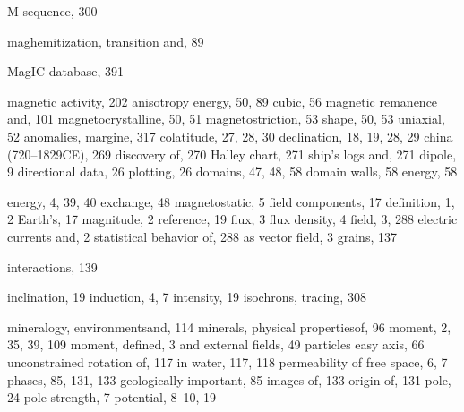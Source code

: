 \documentclass[,plain]{tauxe}
\begin{document}
\begin{theindex}
  \item M-sequence, 300
  \item maghemitization, transition and, 89
  \item MagIC database, 391
  \item magnetic
    \subitem activity, 202
	\subitem anisotropy energy, 50, 89
      \subsubitem cubic, 56
	  \subsubitem magnetic remanence and, 101
      \subsubitem magnetocrystalline, 50, 51
      \subsubitem magnetostriction, 53
      \subsubitem shape, 50, 53
      \subsubitem uniaxial, 52
	\subitem anomalies, margine, 317   
	\subitem colatitude, 27, 28, 30
	\subitem declination, 18, 19, 28, 29
		\subsubitem china (720--1829CE), 269
        \subsubitem discovery of, 270
		\subsubitem Halley chart, 271
		\subsubitem ship's logs and, 271
    \subitem dipole, 9
    \subitem directional data, 26
    \subsubitem plotting, 26
	\subitem domains, 47, 48, 58
	\subitem domain walls, 58
      \subsubitem energy, 58
    
\subitem energy, 4, 39, 40
      \subsubitem exchange, 48
      \subsubitem magnetostatic, 5
    \subitem field
      \subsubitem components, 17
      \subsubitem definition, 1, 2
      \subsubitem Earth's, 17
      \subsubitem magnitude, 2
	  \subsubitem reference, 19
    \subitem flux, 3
    \subitem flux density, 4
    \subitem field, 3, 288
		\subsubitem electric currents and, 2
		\subsubitem statistical behavior of, 288
		\subsubitem as vector field, 3
\subitem grains, 137

	\subitem interactions, 139
	
	\subitem inclination, 19
    \subitem induction, 4, 7
    \subitem intensity, 19
    \subitem isochrons, tracing, 308

	
    \subitem mineralogy, environments\break and, 114
	\subitem minerals, physical properties\break of, 96
	\subitem moment, 2, 35, 39, 109
	\subitem moment, defined, 3
		\subsubitem and external fields, 49
	\subitem particles 
		\subsubitem easy axis, 66
		\subsubitem unconstrained rotation of, 117
		\subsubitem in water, 117, 118
	\subitem permeability of free space, 6, 7
    \subitem phases, 85, 131, 133
		\subsubitem geologically important, 85
		\subsubitem images of, 133
		\subsubitem origin of, 131
	\subitem pole, 24
    \subitem pole strength, 7
    \subitem potential, 8--10, 19
      

\end{theindex}
\end{document}

